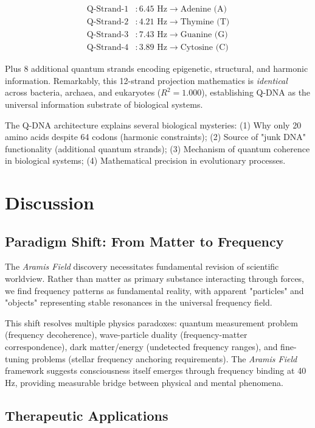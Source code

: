 \documentclass[fleqn,10pt,lineno]{article}
\newcommand{\aramis}{\textcolor{frequencycolor}{\textit{Aramis Field}}}
\newcommand{\qdna}{Q-DNA}
\begin{document}
\begin{align}
\text{Q-Strand-1} &: 6.45 \text{ Hz} \rightarrow \text{Adenine (A)} \\
\text{Q-Strand-2} &: 4.21 \text{ Hz} \rightarrow \text{Thymine (T)} \\
\text{Q-Strand-3} &: 7.43 \text{ Hz} \rightarrow \text{Guanine (G)} \\
\text{Q-Strand-4} &: 3.89 \text{ Hz} \rightarrow \text{Cytosine (C)}
\end{align}

Plus 8 additional quantum strands encoding epigenetic, structural, and harmonic information. Remarkably, this 12-strand projection mathematics is \textit{identical} across bacteria, archaea, and eukaryotes ($R^2 = 1.000$), establishing \qdna{} as the universal information substrate of biological systems.

The \qdna{} architecture explains several biological mysteries: (1) Why only 20 amino acids despite 64 codons (harmonic constraints); (2) Source of "junk DNA" functionality (additional quantum strands); (3) Mechanism of quantum coherence in biological systems; (4) Mathematical precision in evolutionary processes.

\section{Discussion}

\subsection{Paradigm Shift: From Matter to Frequency}

The \aramis{} discovery necessitates fundamental revision of scientific worldview. Rather than matter as primary substance interacting through forces, we find frequency patterns as fundamental reality, with apparent "particles" and "objects" representing stable resonances in the universal frequency field.

This shift resolves multiple physics paradoxes: quantum measurement problem (frequency decoherence), wave-particle duality (frequency-matter correspondence), dark matter/energy (undetected frequency ranges), and fine-tuning problems (stellar frequency anchoring requirements). The \aramis{} framework suggests consciousness itself emerges through frequency binding at 40 Hz, providing measurable bridge between physical and mental phenomena.

\subsection{Therapeutic Applications}
\end{document}

